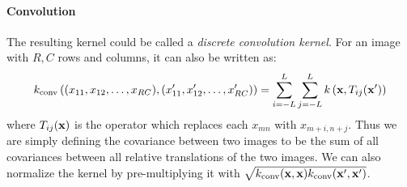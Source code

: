 \paragraph{Convolution} The resulting kernel could be called a \emph{discrete convolution kernel}.  For an image with $R, C$ rows and columns, it can also be written as:
%
\begin{align}
k_{\textnormal{conv}} \left( (x_{11}, x_{12}, \dots, x_{RC} ), (x_{11}', x_{12}', \dots, x_{RC}' ) \right) = %
\sum_{i=-L}^L \sum_{j=-L}^L k\left( \vx, T_{ij}(\vx') \right)
\end{align}
%
where $T_{ij}({\bf{x}})$ is the operator which replaces each $x_{mn}$ with $x_{m+i, n+j}$.  Thus we are simply defining the covariance between two images to be the sum of all covariances between all relative translations of the two images.  We can also normalize the kernel by pre-multiplying it with $\sqrt{k_{\textnormal{conv}}({\bf{x}}, {\bf{x}}) k_{\textnormal{conv}}({\bf{x}}', {\bf{x}}') }$.















